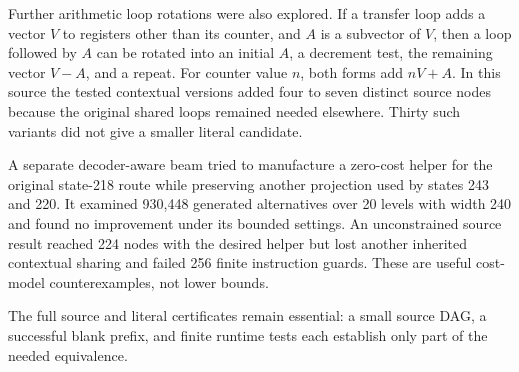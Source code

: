 \documentclass[10pt]{article}
\begin{document}
Further arithmetic loop rotations were also explored. If a transfer loop
adds a vector $V$ to registers other than its counter, and $A$ is a subvector
of $V$, then a loop followed by $A$ can be rotated into an initial $A$, a
decrement test, the remaining vector $V-A$, and a repeat. For counter value
$n$, both forms add $nV+A$. In this source the tested contextual versions
added four to seven distinct source nodes because the original shared loops
remained needed elsewhere. Thirty such variants did not give a smaller
literal candidate.

A separate decoder-aware beam tried to manufacture a zero-cost helper for
the original state-218 route while preserving another projection used by
states 243 and 220. It examined 930,448 generated alternatives over 20 levels
with width 240 and found no improvement under its bounded settings. An
unconstrained source result reached 224 nodes with the desired helper but
lost another inherited contextual sharing and failed 256 finite instruction
guards. These are useful cost-model counterexamples, not lower bounds.

The full source and literal certificates remain essential: a small source
DAG, a successful blank prefix, and finite runtime tests each establish only
part of the needed equivalence.
\end{document}
